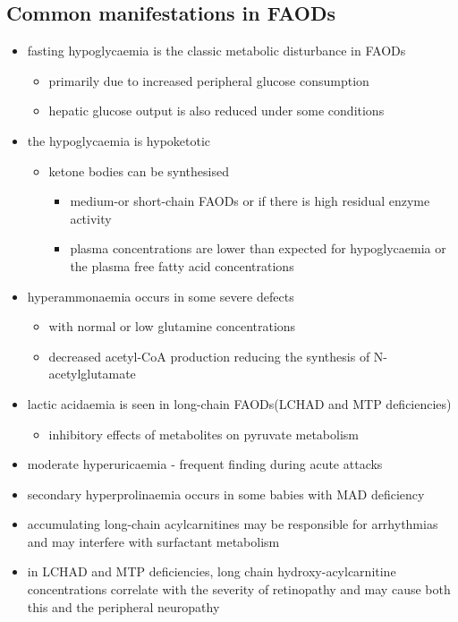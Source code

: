 \documentclass{scrartcl}
\begin{document}
\subsection{Common manifestations in FAODs}
\label{sec:orge7a7bdb}
\begin{itemize}
\item fasting hypoglycaemia is the classic metabolic disturbance in FAODs
\begin{itemize}
\item primarily due to increased peripheral glucose consumption
\item hepatic glucose output is also reduced under some conditions
\end{itemize}
\item the hypoglycaemia is hypoketotic
\begin{itemize}
\item ketone bodies can be synthesised
\begin{itemize}
\item medium-or short-chain FAODs or if there is high residual enzyme activity
\item plasma concentrations are lower than expected for hypoglycaemia or the plasma free fatty acid concentrations
\end{itemize}
\end{itemize}
\item hyperammonaemia occurs in some severe defects
\begin{itemize}
\item with normal or low glutamine concentrations
\item decreased acetyl-CoA production reducing the synthesis of N-acetylglutamate
\end{itemize}
\item lactic acidaemia is seen in long-chain FAODs(LCHAD and MTP deficiencies)
\begin{itemize}
\item inhibitory effects of metabolites on pyruvate metabolism
\end{itemize}
\item moderate hyperuricaemia - frequent finding during acute attacks
\item secondary hyperprolinaemia occurs in some babies with MAD deficiency
\item accumulating long-chain acylcarnitines may be responsible for
arrhythmias and may interfere with surfactant metabolism
\item in LCHAD and MTP deficiencies, long chain hydroxy-acylcarnitine
concentrations correlate with the severity of retinopathy and may
cause both this and the peripheral neuropathy
\end{itemize}
\end{document}
